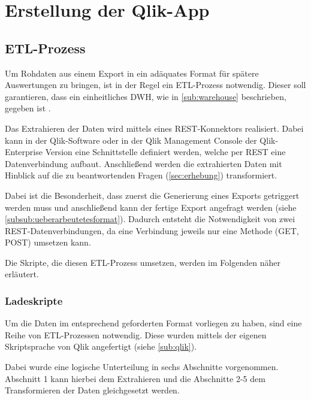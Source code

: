 \section{Erstellung der Qlik-App}
\label{sec:erstellung}
\subsection{ETL-Prozess}
\label{sub:etl}
Um Rohdaten aus einem Export in ein adäquates Format für spätere Auswertungen zu bringen, ist in der Regel ein \gls{ETL}-Prozess notwendig.
Dieser soll garantieren, dass ein einheitliches \gls{DWH}, wie in \ref{sub:warehouse} beschrieben, gegeben ist \cite[S.49]{Gabriel.2011}.

Das Extrahieren der Daten wird mittels eines \gls{REST}-Konnektors realisiert.
Dabei kann in der Qlik-Software oder in der Qlik Management Console der Qlik-Enterprise Version eine Schnittstelle definiert werden, welche per REST eine Datenverbindung aufbaut.
Anschließend werden die extrahierten Daten mit Hinblick auf die zu beantwortenden Fragen (\ref{sec:erhebung}) transformiert.

Dabei ist die Besonderheit, dass zuerst die Generierung eines Exports getriggert werden muss und anschließend kann der fertige Export angefragt werden (siehe \ref{subsub:ueberarbeutetesformat}).
Dadurch entsteht die Notwendigkeit von zwei REST-Datenverbindungen, da eine Verbindung jeweils nur eine Methode (GET, POST) umsetzen kann.

Die Skripte, die diesen ETL-Prozess umsetzen, werden im Folgenden näher erläutert.

\subsubsection{Ladeskripte}
\label{subsub:scripts}

Um die Daten im entsprechend geforderten Format vorliegen zu haben, sind eine Reihe von \gls{ETL}-Prozessen notwendig.
Diese wurden mittels der eigenen Skriptsprache von Qlik angefertigt (siehe \ref{sub:qlik}).

Dabei wurde eine logische Unterteilung in sechs Abschnitte vorgenommen.
Abschnitt 1 kann hierbei dem Extrahieren und die Abschnitte 2-5 dem Transformieren der Daten gleichgesetzt werden.

